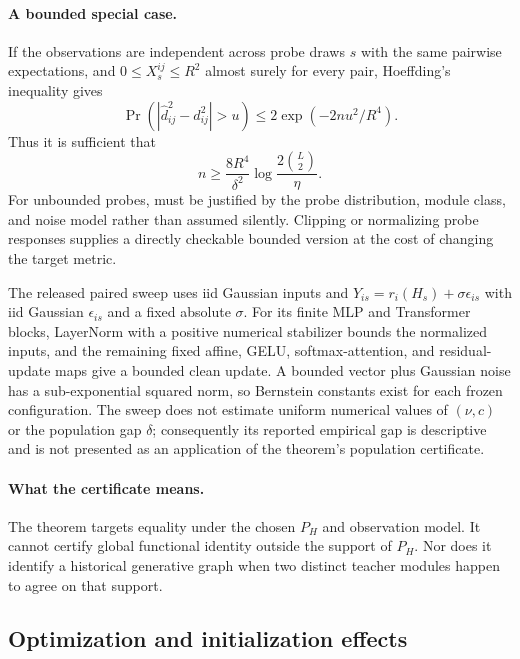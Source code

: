 \paragraph{A bounded special case.}
If the observations are independent across probe draws $s$ with the same
pairwise expectations, and $0\le X_s^{ij}\le R^2$ almost surely for every
pair, Hoeffding's inequality
gives
\begin{equation}
 \Pr(|\widehat d_{ij}^2-d_{ij}^2|>u)
 \le2\exp(-2nu^2/R^4).
\end{equation}
Thus it is sufficient that
\begin{equation}
 n\ge\frac{8R^4}{\delta^2}
 \log\frac{2\binom{L}{2}}{\eta}.
 \label{eq:app_bounded_probe}
\end{equation}
For unbounded probes,  must be justified by
the probe distribution, module class, and noise model rather than assumed
silently.  Clipping or normalizing probe responses supplies a directly
checkable bounded version at the cost of changing the target metric.

The released paired sweep uses iid Gaussian inputs and
$Y_{is}=r_i(H_s)+\sigma\epsilon_{is}$ with iid Gaussian $\epsilon_{is}$ and a
fixed absolute $\sigma$.  For its finite MLP and Transformer blocks, LayerNorm
with a positive numerical stabilizer bounds the normalized inputs, and the
remaining fixed affine, GELU, softmax-attention, and residual-update maps give a
bounded clean update.  A bounded vector plus Gaussian noise has a
sub-exponential squared norm, so Bernstein constants exist for each frozen
configuration.  The sweep does not estimate uniform numerical values of
$(\nu,c)$ or the population gap $\delta$; consequently its reported empirical
gap is descriptive and is not presented as an application of the theorem's
population certificate.

\paragraph{What the certificate means.}
The theorem targets equality under the chosen $P_H$ and observation model.
It cannot certify global functional identity outside the support of $P_H$.
Nor does it identify a historical generative graph when two distinct teacher
modules happen to agree on that support.

\subsection{Optimization and initialization effects}
\label{app:dynamics_proofs}

